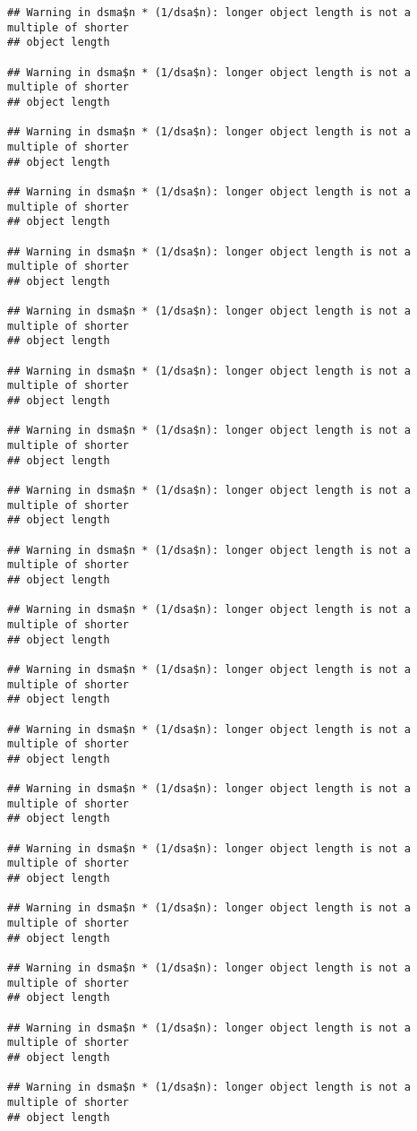 \documentclass[
]{article}
\begin{document}
\begin{verbatim}
## Warning in dsma$n * (1/dsa$n): longer object length is not a multiple of shorter
## object length

## Warning in dsma$n * (1/dsa$n): longer object length is not a multiple of shorter
## object length

## Warning in dsma$n * (1/dsa$n): longer object length is not a multiple of shorter
## object length

## Warning in dsma$n * (1/dsa$n): longer object length is not a multiple of shorter
## object length

## Warning in dsma$n * (1/dsa$n): longer object length is not a multiple of shorter
## object length

## Warning in dsma$n * (1/dsa$n): longer object length is not a multiple of shorter
## object length

## Warning in dsma$n * (1/dsa$n): longer object length is not a multiple of shorter
## object length

## Warning in dsma$n * (1/dsa$n): longer object length is not a multiple of shorter
## object length

## Warning in dsma$n * (1/dsa$n): longer object length is not a multiple of shorter
## object length

## Warning in dsma$n * (1/dsa$n): longer object length is not a multiple of shorter
## object length

## Warning in dsma$n * (1/dsa$n): longer object length is not a multiple of shorter
## object length

## Warning in dsma$n * (1/dsa$n): longer object length is not a multiple of shorter
## object length

## Warning in dsma$n * (1/dsa$n): longer object length is not a multiple of shorter
## object length

## Warning in dsma$n * (1/dsa$n): longer object length is not a multiple of shorter
## object length

## Warning in dsma$n * (1/dsa$n): longer object length is not a multiple of shorter
## object length

## Warning in dsma$n * (1/dsa$n): longer object length is not a multiple of shorter
## object length

## Warning in dsma$n * (1/dsa$n): longer object length is not a multiple of shorter
## object length

## Warning in dsma$n * (1/dsa$n): longer object length is not a multiple of shorter
## object length

## Warning in dsma$n * (1/dsa$n): longer object length is not a multiple of shorter
## object length


\end{verbatim}
\end{document}
